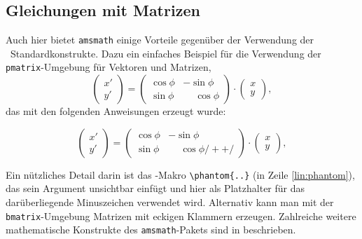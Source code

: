 \subsection{Gleichungen mit Matrizen}

Auch hier bietet \texttt{amsmath} einige Vorteile gegenüber der Verwendung der \latex\ Standardkonstrukte. Dazu ein einfaches Beispiel für die Verwendung der \texttt{pmatrix}-Umgebung für Vektoren und Matrizen,
%
\begin{equation}
\begin{pmatrix} x' \\ y' \end{pmatrix}
= 
\begin{pmatrix}
  \cos \phi & -\sin \phi \\
  \sin \phi & \phantom{-}\cos \phi
\end{pmatrix} 
\cdot
\begin{pmatrix}	x \\ y \end{pmatrix} ,
\end{equation}
%
das mit den folgenden Anweisungen erzeugt wurde:
%
\begin{LaTeXCode}
\begin{equation}
\begin{pmatrix} 
		x' \\ 
		y' 
\end{pmatrix}
= 
\begin{pmatrix}
	  \cos \phi & -\sin \phi \\
	  \sin \phi & \phantom{-}\cos \phi /+ \label{lin:phantom} +/
\end{pmatrix} 
\cdot
\begin{pmatrix} 
		x \\ 
		y 
\end{pmatrix} ,
\end{equation}
\end{LaTeXCode}
%
Ein nützliches Detail darin ist das \tex-Makro \verb!\phantom{..}! (in Zeile \ref{lin:phantom}), das sein Argument unsichtbar einfügt und hier als Platzhalter für das darüberliegende Minuszeichen verwendet wird. Alternativ kann man mit der \texttt{bmatrix}-Umgebung Matrizen mit eckigen Klammern erzeugen.
Zahlreiche weitere mathematische Konstrukte des \texttt{amsmath}-Pakets sind in \cite{amsldoc02} beschrieben.

